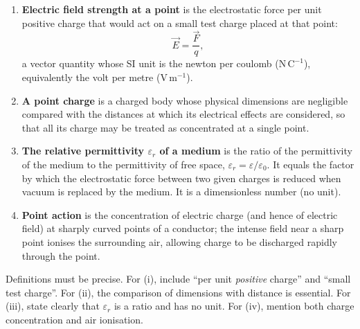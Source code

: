 \documentclass[11pt]{article}
\begin{document}
\begin{corrige}
\begin{enumerate}
\item \textbf{Electric field strength at a point} is the electrostatic force per unit positive charge that would act on a small test charge placed at that point:
\[
\vec{E} = \frac{\vec{F}}{q},
\]
a vector quantity whose SI unit is the newton per coulomb ($\mathrm{N\,C^{-1}}$), equivalently the volt per metre ($\mathrm{V\,m^{-1}}$).
\item \textbf{A point charge} is a charged body whose physical dimensions are negligible compared with the distances at which its electrical effects are considered, so that all its charge may be treated as concentrated at a single point.
\item \textbf{The relative permittivity $\varepsilon_{r}$ of a medium} is the ratio of the permittivity of the medium to the permittivity of free space, $\varepsilon_{r} = \varepsilon/\varepsilon_{0}$. It equals the factor by which the electrostatic force between two given charges is reduced when vacuum is replaced by the medium. It is a dimensionless number (no unit).
\item \textbf{Point action} is the concentration of electric charge (and hence of electric field) at sharply curved points of a conductor; the intense field near a sharp point ionises the surrounding air, allowing charge to be discharged rapidly through the point.
\end{enumerate}
\end{corrige}

\begin{attention}
Definitions must be precise. For (i), include ``per unit \emph{positive} charge'' and ``small test charge''. For (ii), the comparison of dimensions with distance is essential. For (iii), state clearly that $\varepsilon_{r}$ is a ratio and has no unit. For (iv), mention both charge concentration and air ionisation.
\end{attention}
\end{document}
